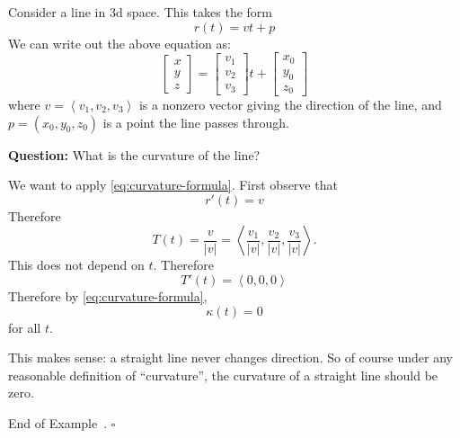 \documentclass[10pt]{article}
\theoremstyle{definition}
\newtheorem{example}[theorem]{Example}
\renewenvironment{example}
{\begin{oldexample}}
  {\par\smallskip\hfill   End of Example~\theexample. $\square$    \par\end{oldexample}}
\newcommand{\fl}{\noindent\textbf} %
\newcommand{\1}[1]{\textbf{1}_{\left[#1\right]}} %
\begin{document}
\begin{example}[Curvature of a line]
  \label{ex:curvature-line}

  Consider a line in 3d space. This takes the form
  \begin{equation*}
    r(t) = vt+p
  \end{equation*}
  We can write out the above equation as:
  \begin{equation*}
    \begin{bmatrix}
      x\\y\\z
    \end{bmatrix}
    =
    \begin{bmatrix}
      v_{1}\\v_{2}\\v_{3}
    \end{bmatrix}
    t
    +
    \begin{bmatrix}
      x_{0}\\y_{0}\\z_{0}
    \end{bmatrix}
  \end{equation*}
  where $v= \left\langle v_{1},v_{2},v_{3} \right\rangle $ is a nonzero vector giving the direction of
  the line, and $p=(x_{0},y_{0},z_{0})$ is a point the line passes through.

  \fl{Question:} What is the curvature of the line?

  We want to apply \cref{eq:curvature-formula}. First observe that 
  \begin{equation*}
    r'(t)  = v
  \end{equation*}
  Therefore
  \begin{equation*}
    T(t) = \frac{v}{|v|} = \left\langle \frac{v_{1}}{|v|}, \frac{v_{2}}{|v|}, \frac{v_{3}}{|v|}  \right\rangle .
  \end{equation*}
  This does not depend on $t$. Therefore
  \begin{equation*}
    T'(t) = \left\langle 0,0,0 \right\rangle 
  \end{equation*}
  Therefore by \cref{eq:curvature-formula},
  \begin{equation*}
    \kappa(t)  = 0
  \end{equation*}
  for all $t$.

  This makes sense: a straight line never changes direction. So of course under any reasonable definition
  of ``curvature'', the curvature of a straight line should be zero.
\end{example}
\end{document}
